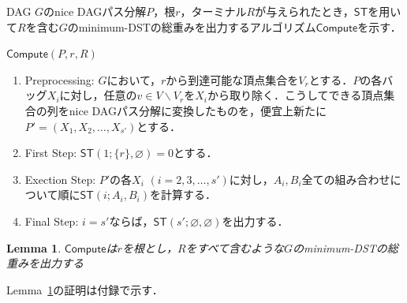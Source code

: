 \documentclass[master]{kuisthesis}		%
\theoremstyle{plain}
\newtheorem{lemma}{Lemma}
\theoremstyle{definition}
\begin{document}
    



DAG $G$のnice DAGパス分解$P$，根$r$，ターミナル$R$が与えられたとき，$\mathsf{ST}$を用いて$R$を含む$G$のminimum-DSTの総重みを出力するアルゴリズム$\mathsf{Compute}$を示す．


$\mathsf{Compute}(P, r, R)$


\begin{enumerate}
    \item Preprocessing: $G$において，$r$から到達可能な頂点集合を$V_r$とする．$P$の各バッグ$X_i$に対し，任意の$v \in V \backslash V_r$を$X_i$から取り除く．こうしてできる頂点集合の列をnice DAGパス分解に変換したものを，便宜上新たに$P' = (X_1, X_2, \dots , X_{s'})$とする．
    \item First Step: $\mathsf{ST}(1; \{r\}, \varnothing) = 0$とする．
    \item Exection Step: $P'$の各$X_i$ $(i=2, 3, \dots, s')$に対し，$A_i, B_i$全ての組み合わせについて順に$\mathsf{ST}(i; A_i, B_i)$を計算する．
    \item Final Step: $i = s'$ならば，$\mathsf{ST}(s'; \varnothing, \varnothing)$を出力する．
\end{enumerate}


\begin{lemma}\label{dst}
    $\mathsf{Compute}$は$r$を根とし，$R$をすべて含むような$G$のminimum-DSTの総重みを出力する
\end{lemma}

Lemma~\ref{dst}の証明は付録で示す．
\end{document}
